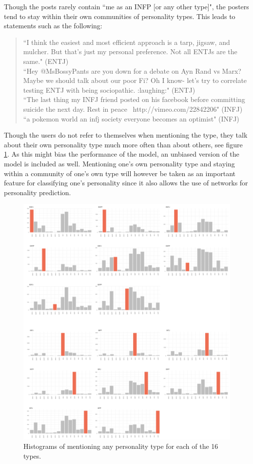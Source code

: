 Though the posts rarely contain ``me as an INFP [or any other type]", the posters tend to stay within their own communities  of personality types. This leads to statements such as the following:

\begin{quote}
    ``I think the easiest and most efficient approach is a tarp, jigsaw, and mulcher. But that's just my personal preference. Not all ENTJs are the same." (ENTJ)\\[4pt]
    ``Hey @MsBossyPants are you down for a debate on Ayn Rand vs Marx? Maybe we should talk about our poor Fi? Oh I know- let's try to correlate testing ENTJ with being sociopathic.  :laughing:" (ENTJ)\\[4pt]
    ``The last thing my INFJ friend posted on his facebook before committing suicide the next day. Rest in peace~   http://vimeo.com/22842206" (INFJ)\\[4pt]
    ``a pokemon world  an infj society  everyone becomes an optimist" (INFJ)
\end{quote}

Though the users do not refer to themselves when mentioning the type, they talk about their own personality type much more often than about others, see figure \ref{fig:types}. As this might bias the performance of the model, an unbiased version of the model is included as well. Mentioning one's own personality type and staying within a community of one's own type will however be taken as an important feature for classifying one's personality since it also allows the use of networks for personality prediction.

\begin{figure}
\centering
  \includegraphics[width=\textwidth]{barchartstype.png}
\caption{Histograms of mentioning any personality type for each of the 16 types.} 
\label{fig:types}
\end{figure}